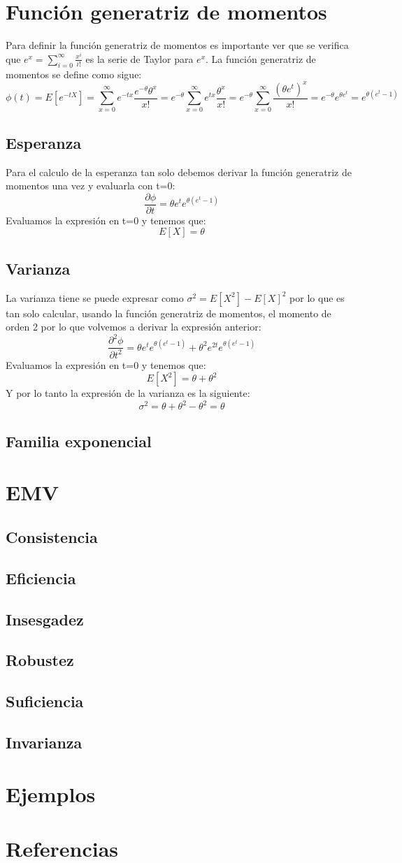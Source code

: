 \documentclass[a4paper, 10pt]{article} %
\begin{document}
\section{Función generatriz de momentos}
Para definir la función generatriz de momentos es importante ver que se verifica que $e^x=\sum_{i=0}^{\infty}\frac{x^i}{i!}$ es la serie de Taylor para $e^x$.
La función generatriz de momentos se define como sigue:
$$\phi(t)=E[e^{-tX}]=\sum_{x=0}^{\infty}e^{-t x}\frac{e^{-\theta}\theta^x}{x!}=e^{-\theta}\sum_{x=0}^{\infty}e^{t x}\frac{\theta^x}{x!}=e^{-\theta}\sum_{x=0}^{\infty}\frac{(\theta e^t)^x}{x!}=e^{-\theta}e^{\theta e^t}=e^{\theta(e^t-1)}$$
\subsection{Esperanza}
Para el calculo de la esperanza tan solo debemos derivar la función generatriz de momentos una vez y evaluarla con t=0:
$$\frac{\partial\phi}{\partial t} = \theta e^t e^{\theta(e^t-1)}$$
Evaluamos la expresión en t=0 y tenemos que:
$$E[X]=\theta$$
\subsection{Varianza}
La varianza tiene se puede expresar como $\sigma^2=E[X^2]-E[X]^2$ por lo que es tan solo calcular, usando la función generatriz de momentos, el momento de orden 2 por lo que volvemos a derivar la expresión anterior:
$$\frac{\partial^2\phi}{\partial t^2} = \theta e^t e^{\theta(e^t-1)}+\theta^2 e^{2t} e^{\theta(e^t-1)}$$
Evaluamos la expresión en t=0 y tenemos que:
$$E[X^2]=\theta+\theta^2$$
Y por lo tanto la expresión de la varianza es la siguiente:
$$\sigma^2=\theta+\theta^2-\theta^2=\theta$$

\subsection{Familia exponencial}
\section{EMV}

\subsection{Consistencia}
\subsection{Eficiencia}
\subsection{Insesgadez}
\subsection{Robustez}
\subsection{Suficiencia}
\subsection{Invarianza}
\section{Ejemplos}
\section{Referencias}
\end{document}
